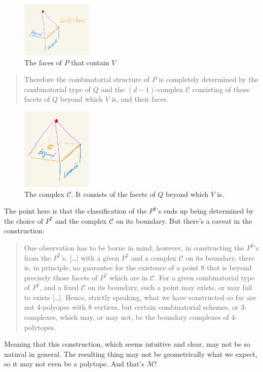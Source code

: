  \begin{figure}[H]
 	\centering
 	\includegraphics[width=0.3\textwidth]{fig6}
 	\caption*{The faces of \(P\) that contain \(V\)}
 \end{figure}
\begin{quotation}
	Therefore the combinatorial structure of \(P\) is completely determined by the combinatorial type of \(Q\) and the \((d-1)\)-complex \(\mathcal{C}\) consisting of those facets of \(Q\) beyond which \(V\) is, and their faces.
\end{quotation}
\begin{figure}[H]
	\centering
	\includegraphics[width=0.3\textwidth]{fig7}
	\caption*{The complex \(\mathcal{C}\). It consists of the facets of \(Q\) beyond which \(V\) is.}
\end{figure}
The point here is that the classification of the \(P^8\)'s ends up being determined by the choice of \(P^7\) and the complex \(\mathcal{C}\) on its boundary. But there's a caveat in the construction:
\begin{quotation}
	One observation has to be borne in mind, however, in constructing the \(P^8\)'s from the \(P^7\)'s. […] with a given \(P^7\) and a complex \(\mathcal{C}\) on its boundary, there is, in principle, no guarantee for the existence of a point 8 that is beyond precisely those facets of \(P^7\) which are in \(\mathcal{C}\). For a given combinatorial type of \(P^7\), and a fixed \(\mathcal{C}\) on its boundary, such a point may exists, or may fail to exists […]. Hence, strictly speaking, what we have constructed so far are not 4-polyopes with 8 vertices, but certain combinatorial schemes, or 3-complexes, which may, or may not, be the boundary complexes of 4-polytopes.
\end{quotation}
Meaning that this construction, which seems intuitive and clear, may not be so natural in general. The resulting thing may not be geometrically what we expect, so it may not even be a polytope. And that's \(\mathcal{M}\)!

